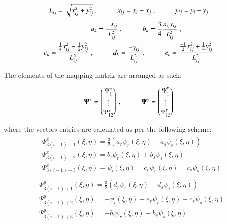 \begin{equation} 
L_{ij} = \sqrt{x_{ij}^2 + y_{ij}^2}\ ,
\hspace{10mm}
x_{ij} = x_i - x_j\ ,
\hspace{10mm}
y_{ij} = y_i - y_j
\label{equation22}
\end{equation}
\begin{gather} 
	\begin{aligned}
		&a_k = \frac{-x_{ij}}{L_{ij}^2}\ ,
		\hspace{10mm}
		b_k = \frac{3}{4} \frac{x_{ij} y_{ij}}{L_{ij}^2}\ , \\
		c_k = \frac{\frac{1}{4} x_{ij}^2 - \frac{1}{2} y_{ij}^2}{L_{ij}^2}\
		& ,
		\hspace{10mm}
		d_k = \frac{-y_{ij}}{L_{ij}^2}\ ,
		\hspace{10mm}
		e_k = \frac{\frac{-1}{2} x_{ij}^2 + \frac{1}{4} y_{ij}^2}{L_{ij}^2}
		\label{equation23}
	\end{aligned}
\end{gather}

The elements of the mapping matrix are arranged as such:

\begin{equation} 
\mathbf{\Psi}^x = 
\begin{pmatrix}
\Psi_1^x \\
\vdots \\
\Psi_{12}^x
\end{pmatrix}\ ,
\hspace{10mm}
\mathbf{\Psi}^y = 
\begin{pmatrix}
\Psi_1^y \\
\vdots \\
\Psi_{12}^y
\end{pmatrix}
\label{equation24}
\end{equation}

where the vectors entries are calculated as per the following scheme:
\begin{gather} 
	\begin{aligned}
		&\Psi_{3(i-1)+1}^x (\xi , \eta) = \frac{3}{2} (a_r \psi_r (\xi , \eta) - a_s \psi_s (\xi , \eta) ) \\
		&\Psi_{3(i-1)+2}^x (\xi , \eta) = b_r \psi_r (\xi , \eta) + b_s \psi_s (\xi , \eta) \\
		&\Psi_{3(i-1)+3}^x (\xi , \eta) = \psi_i (\xi , \eta) - c_r \psi_r (\xi , \eta) - c_s \psi_s (\xi , \eta)
		\label{equation25}
	\end{aligned}
\end{gather}
\begin{gather} 
	\begin{aligned}
		&\Psi_{3(i-1)+1}^y (\xi , \eta) = \frac{3}{2} (d_r \psi_r (\xi , \eta) - d_s \psi_s (\xi , \eta) ) \\
		&\Psi_{3(i-1)+2}^y (\xi , \eta) = -\psi_i (\xi , \eta) + e_r \psi_r (\xi , \eta) + c_s \psi_s (\xi , \eta) \\
		&\Psi_{3(i-1)+3}^y (\xi , \eta) = -b_r \psi_r (\xi , \eta) - b_s \psi_s (\xi , \eta)
		\label{equation26}
	\end{aligned}
\end{gather}

